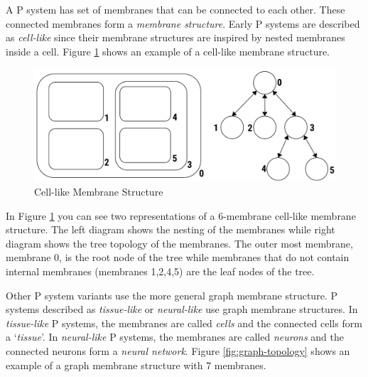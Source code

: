 \documentclass{article}
\begin{document}
A P system has set of membranes that can be connected to each other. These connected membranes form
a \textit{membrane structure}. Early P systems are described as \textit{cell-like} since their 
membrane structures are inspired by nested membranes inside a cell. Figure \ref{fig:cell-like} shows 
an example of a cell-like membrane structure.

\begin{figure}[H]
\begin{center}
\includegraphics[scale=0.60]{figures/zzz-cell-like-structure.pdf}
\caption{Cell-like Membrane Structure}
\label{fig:cell-like}
\end{center}
\end{figure}

In Figure \ref{fig:cell-like} you can see two representations of a 6-membrane cell-like membrane 
structure. The left diagram shows the nesting of the membranes while right diagram shows the tree 
topology of the membranes. The outer most membrane, membrane 0, is the root node of the tree while 
membranes that do not contain internal membranes (membranes 1,2,4,5) are the leaf nodes of the tree.

Other P system variants use the more general graph membrane structure. P systems described as
\textit{tissue-like} or \textit{neural-like} use graph membrane structures. In \textit{tissue-like}
P systems, the membranes are called \textit{cells} and the connected cells form a `\textit{tissue}'. 
In \textit{neural-like} P systems, the membranes are called \textit{neurons} and the connected 
neurons form a \textit{neural network}. Figure \ref{fig:graph-topology} shows an example of a graph
membrane structure with 7 membranes.
\end{document}
